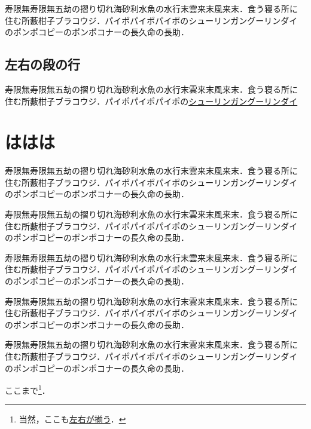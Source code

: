 \documentclass[a4j, 12Q, twocolumn, twoside, draft]{jsarticle}
\begin{document}
寿限無寿限無五劫の摺り切れ海砂利水魚の水行末雲来末風来末．食う寝る所に
住む所藪柑子ブラコウジ．パイポパイポパイポのシューリンガングーリンダイ
のポンポコピーのポンポコナーの長久命の長助．

\subsection{左右の段の行}


寿限無寿限無五劫の摺り切れ海砂利水魚の水行末雲来末風来末．食う寝る所に
住む所藪柑子ブラコウジ．パイポパイポパイポの\underline{シューリンガングーリンダイ}


\section{ははは}
寿限無寿限無五劫の摺り切れ海砂利水魚の水行末雲来末風来末．食う寝る所に
住む所藪柑子ブラコウジ．パイポパイポパイポのシューリンガングーリンダイ
のポンポコピーのポンポコナーの長久命の長助．

寿限無寿限無五劫の摺り切れ海砂利水魚の水行末雲来末風来末．食う寝る所に
住む所藪柑子ブラコウジ．パイポパイポパイポのシューリンガングーリンダイ
のポンポコピーのポンポコナーの長久命の長助．

寿限無寿限無五劫の摺り切れ海砂利水魚の水行末雲来末風来末．食う寝る所に
住む所藪柑子ブラコウジ．パイポパイポパイポのシューリンガングーリンダイ
のポンポコピーのポンポコナーの長久命の長助．

寿限無寿限無五劫の摺り切れ海砂利水魚の水行末雲来末風来末．食う寝る所に
住む所藪柑子ブラコウジ．パイポパイポパイポのシューリンガングーリンダイ
のポンポコピーのポンポコナーの長久命の長助．

寿限無寿限無五劫の摺り切れ海砂利水魚の水行末雲来末風来末．食う寝る所に
住む所藪柑子ブラコウジ．パイポパイポパイポのシューリンガングーリンダイ
のポンポコピーのポンポコナーの長久命の長助．

ここまで\footnote{当然，ここも\underline{左右が揃う}．}．
\end{document}

